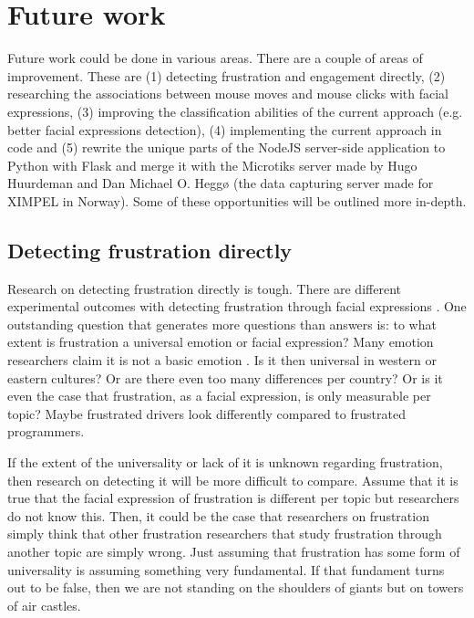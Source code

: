 
\section{Future work} %
Future work could be done in various areas. There are a couple of areas of improvement. These are (1) detecting frustration and engagement directly, (2) researching the associations between mouse moves and mouse clicks with facial expressions, (3) improving the classification abilities of the current approach (e.g. better facial expressions detection), (4) implementing the current approach in code and (5) rewrite the unique parts of the NodeJS server-side application to Python with Flask and merge it with the Microtiks server made by Hugo Huurdeman and Dan Michael O. Heggø (the data capturing server made for XIMPEL in Norway). Some of these opportunities will be outlined more in-depth.


\subsection{Detecting frustration directly}
Research on detecting frustration directly is tough. There are different experimental outcomes with detecting frustration through facial expressions \cite{craig2008, grafsgaard2013, ihme2018}. One outstanding question that generates more questions than answers is: to what extent is frustration a universal emotion or facial expression? Many emotion researchers claim it is not a basic emotion \cite{ortony1990}. Is it then universal in western or eastern cultures? Or are there even too many differences per country? Or is it even the case that frustration, as a facial expression, is only measurable per topic? Maybe frustrated drivers look differently compared to frustrated programmers.

If the extent of the universality or lack of it is unknown regarding frustration, then research on detecting it will be more difficult to compare. Assume that it is true that the facial expression of frustration is different per topic but researchers do not know this. Then, it could be the case that researchers on frustration simply think that other frustration researchers that study frustration through another topic are simply wrong. Just assuming that frustration has some form of universality is assuming something very fundamental. If that fundament turns out to be false, then we are not standing on the shoulders of giants but on towers of air castles.


